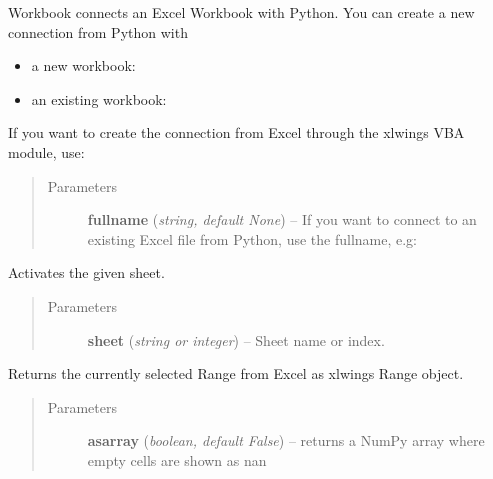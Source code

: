 \documentclass[letterpaper,11pt,english]{sphinxmanual}
\begin{document}
\begin{fulllineitems}
\label{workbook:xlwings.Workbook}
Workbook connects an Excel Workbook with Python. You can create a new connection from Python with
\begin{itemize}
\item {} 
a new workbook: 

\item {} 
an existing workbook: 

\end{itemize}

If you want to create the connection from Excel through the xlwings VBA module, use:

\begin{quote}\begin{description}
\item[{Parameters}] \leavevmode
\textbf{fullname} (\emph{string, default None}) -- If you want to connect to an existing Excel file from Python, use the fullname, e.g:

\end{description}\end{quote}

\begin{fulllineitems}
\label{workbook:xlwings.Workbook.activate}
Activates the given sheet.
\begin{quote}\begin{description}
\item[{Parameters}] \leavevmode
\textbf{sheet} (\emph{string or integer}) -- Sheet name or index.

\end{description}\end{quote}

\end{fulllineitems}


\begin{fulllineitems}
\label{workbook:xlwings.Workbook.get_selection}
Returns the currently selected Range from Excel as xlwings Range object.
\begin{quote}\begin{description}
\item[{Parameters}] \leavevmode
\textbf{asarray} (\emph{boolean, default False}) -- returns a NumPy array where empty cells are shown as nan


\end{description}
\end{quote}
\end{fulllineitems}
\end{fulllineitems}
\end{document}
